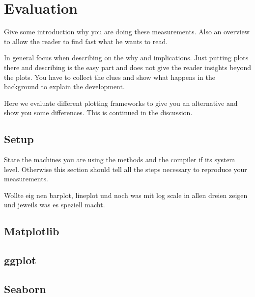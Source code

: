 \chapter{Evaluation}
Give some introduction why you are doing these measurements.
Also an overview to allow the reader to find fast what he wants to read.

In general focus when describing on the why and implications.
Just putting plots there and describing is the easy part and does not give the reader insights beyond the plots.
You have to collect the clues and show what happens in the background to explain the development.

Here we evaluate different plotting frameworks to give you an alternative and show you some differences. This is continued in the discussion.

\section{Setup}
State the machines you are using the methods and the compiler if its system level.
Otherwise this section should tell all the steps necessary to reproduce your measurements.

Wollte eig nen barplot, lineplot und noch was mit log scale in allen dreien zeigen und jeweils was es speziell macht. 

\section{Matplotlib}

\section{ggplot}

\section{Seaborn}
